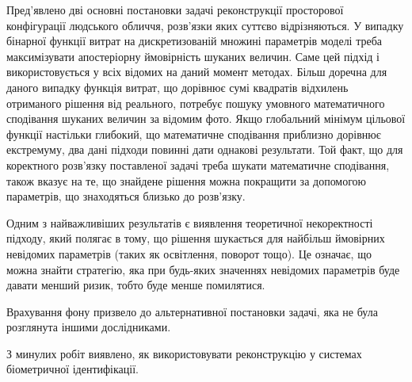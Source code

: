 \chapterConclusion

Пред'явлено дві основні постановки задачі
реконструкції просторової конфігурації людського обличчя,
розв'язки яких суттєво відрізняються.
У випадку бінарної функції витрат на дискретизованій множині параметрів моделі
треба максимізувати апостеріорну ймовірність шуканих величин.
Саме цей підхід і використовується у всіх відомих на даний момент методах.
Більш доречна для даного випадку функція витрат,
що дорівнює сумі квадратів відхилень отриманого рішення від реального,
потребує пошуку умовного математичного сподівання
шуканих величин за відомим фото.
Якщо глобальний мінімум цільової функції настільки глибокий,
що математичне сподівання приблизно дорівнює екстремуму,
два дані підходи повинні дати однакові результати.
Той факт,
що для коректного розв'язку поставленої задачі треба шукати
математичне сподівання,
також вказує на те,
що знайдене рішення можна покращити за допомогою параметрів,
що знаходяться близько до розв'язку.

Одним з найважливіших результатів є виявлення теоретичної некоректності підходу,
який полягає в тому,
що рішення шукається для найбільш ймовірних невідомих параметрів
(таких як освітлення, поворот тощо).
Це означає, що можна знайти стратегію,
яка при будь-яких значеннях невідомих параметрів буде давати менший ризик,
тобто буде менше помилятися.

Врахування фону призвело до альтернативної постановки задачі,
яка не була розглянута іншими дослідниками.

З минулих робіт виявлено,
як використовувати реконструкцію у системах біометричної ідентифікації.
